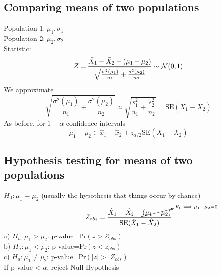 \documentclass{article}
\newcommand{\beq}{\begin{equation}}
\newcommand{\eeq}{\end{equation}}
\begin{document}
\subsection{Comparing means of two populations}
Population 1: $\mu_1,\sigma_1$\\
Population 2: $\mu_2,\sigma_2$\\
Statistic:
\beq
Z = \frac{\bar{X}_1-\bar{X}_2 - (\mu_1-\mu_2)}{\sqrt{\frac{\sigma^2(\mu_1)}{n_1}+\frac{\sigma^2(\mu_2)}{n_2}}} \sim \mathcal{N}(0,1) \\
\eeq
We approximate
\beq
\sqrt{\frac{\sigma^2(\mu_1)}{n_1}+\frac{\sigma^2(\mu_2)}{n_2}} \approx \sqrt{\frac{s_1^2}{n_1}+\frac{s_2^2}{n_2}} = \text{SE}(\bar{X}_1-\bar{X}_2)
\eeq
As before, for $1-\alpha$ confidence intervals
\beq
\mu_1 - \mu_2 \in \hat{x}_1 - \hat{x}_2 \pm z_{\alpha/2}\text{SE}(\bar{X}_1-\bar{X}_2)
\eeq
\subsection{Hypothesis testing for means of two populations}
$H_0:\mu_1 = \mu_2$ (usually the hypothesis that things occur by chance)
\beq
Z_{obs} = \frac{\hat{X}_1-\hat{X}_2-\cancelto{H_0 \implies \mu_1-\mu_2=0}{(\mu_1-\mu_2)}}{\text{SE}(\hat{X}_1-\hat{X}_2)}
\eeq
a) $H_a: \mu_1 > \mu_2$: p-value=Pr$(z>Z_{obs})$\\
b) $H_a: \mu_1 < \mu_2$: p-value=Pr$(z<z_{obs})$\\
c) $H_a:\mu_1\ne\mu_2$: p-value=Pr$(|z|>|Z_{obs})$\\
If p-value < $\alpha$, reject Null Hypothesis
\end{document}
